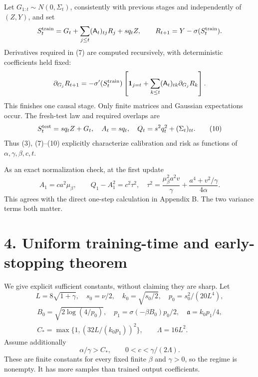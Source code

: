 \documentclass[
  11pt,
  a4paper,
]{article}
\begin{document}
Let \(G_{1:t}\sim N(0,\Sigma_t)\), consistently with previous stages and
independently of \((Z,Y)\), and set \[
S_t^{\rm train}=G_t+\sum_{j\le t}(\mathsf A_t)_{tj}R_j+s q_tZ,
\qquad R_{t+1}=Y-\sigma(S_t^{\rm train}).
\] Derivatives required in (7) are computed recursively, with
deterministic coefficients held fixed: \[
\partial_{G_j}R_{t+1}=-\sigma'(S_t^{\rm train})
\left[\mathbf1_{j=t}+\sum_{k\le t}(\mathsf A_t)_{tk}\partial_{G_j}R_k\right].
\] This finishes one causal stage. Only finite matrices and Gaussian
expectations occur. The fresh-test law and required overlaps are \[
S_t^{\rm test}=s q_tZ+G_t,
\quad A_t=s q_t,
\quad Q_t=s^2q_t^2+(\Sigma_t)_{tt}. \tag{10}
\] Thus (3), (7)--(10) explicitly characterize calibration and risk as
functions of \(\alpha,\gamma,\beta,c,t\).

As an exact normalization check, at the first update \[
A_1=ca^2\mu_\beta,\qquad
Q_1-A_1^2=c^2\tau^2,\quad
\tau^2=\frac{\mu_\beta^2a^2v}{\gamma}+
\frac{a^4+v^2/\gamma}{4\alpha}. \tag{11}
\] This agrees with the direct one-step calculation in Appendix B. The
two variance terms both matter.

\hypertarget{uniform-training-time-and-early-stopping-theorem}{%
\section{4. Uniform training-time and early-stopping
theorem}\label{uniform-training-time-and-early-stopping-theorem}}

We give explicit sufficient constants, without claiming they are sharp.
Let \[
L=8\sqrt{1+\gamma},\quad s_0=\nu/2,\quad k_0=\sqrt{s_0/2},\quad
p_0=s_0^2/(20L^4),
\] \[
\begin{gathered}
B_0=\sqrt{2\log(4/p_0)},\quad p_1=\sigma(-\beta B_0)p_0/2,\quad
\mathfrak a=k_0p_1/4,\\
C_* = \max\{1,(32L/(k_0p_1))^2\},\qquad \Lambda=16L^2.
\end{gathered}
\] Assume additionally \[
\alpha/\gamma>C_*,\qquad 0<c<\gamma/(2\Lambda). \tag{12}
\] These are finite constants for every fixed finite \(\beta\) and
\(\gamma>0\), so the regime is nonempty. It has more samples than
trained output coefficients.
\end{document}
